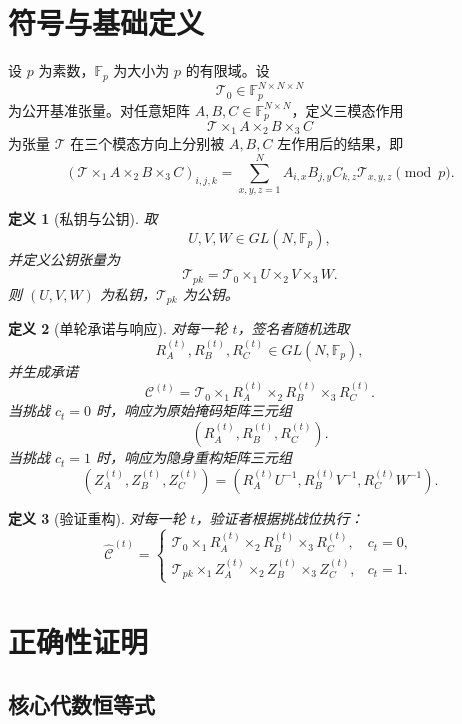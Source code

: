 \documentclass[12pt,a4paper]{article}
\newtheorem{definition}{定义}[section]
\theoremstyle{remark}
\begin{document}
\section{符号与基础定义}

设 $p$ 为素数，$\mathbb{F}_p$ 为大小为 $p$ 的有限域。设
\[
\mathcal{T}_0 \in \mathbb{F}_p^{N\times N\times N}
\]
为公开基准张量。对任意矩阵 $A,B,C\in \mathbb{F}_p^{N\times N}$，定义三模态作用
\[
\mathcal{T}\times_1 A \times_2 B \times_3 C
\]
为张量 $\mathcal{T}$ 在三个模态方向上分别被 $A,B,C$ 左作用后的结果，即
\[
(\mathcal{T}\times_1 A \times_2 B \times_3 C)_{i,j,k}
=\sum_{x,y,z=1}^{N}A_{i,x}B_{j,y}C_{k,z}\mathcal{T}_{x,y,z}\pmod p.
\]

\begin{definition}[私钥与公钥]
取
\[
U,V,W\in GL(N,\mathbb{F}_p),
\]
并定义公钥张量为
\[
\mathcal{T}_{pk}=\mathcal{T}_0 \times_1 U \times_2 V \times_3 W.
\]
则 $(U,V,W)$ 为私钥，$\mathcal{T}_{pk}$ 为公钥。
\end{definition}

\begin{definition}[单轮承诺与响应]
对每一轮 $t$，签名者随机选取
\[
R_A^{(t)},R_B^{(t)},R_C^{(t)}\in GL(N,\mathbb{F}_p),
\]
并生成承诺
\[
\mathcal{C}^{(t)}=\mathcal{T}_0\times_1 R_A^{(t)}\times_2 R_B^{(t)}\times_3 R_C^{(t)}.
\]
当挑战 $c_t=0$ 时，响应为原始掩码矩阵三元组
\[
(R_A^{(t)},R_B^{(t)},R_C^{(t)}).
\]
当挑战 $c_t=1$ 时，响应为隐身重构矩阵三元组
\[
(Z_A^{(t)},Z_B^{(t)},Z_C^{(t)})
=(R_A^{(t)}U^{-1},R_B^{(t)}V^{-1},R_C^{(t)}W^{-1}).
\]
\end{definition}

\begin{definition}[验证重构]
对每一轮 $t$，验证者根据挑战位执行：
\[
\widehat{\mathcal{C}}^{(t)}=
\begin{cases}
\mathcal{T}_0\times_1 R_A^{(t)}\times_2 R_B^{(t)}\times_3 R_C^{(t)}, & c_t=0,\\[0.4em]
\mathcal{T}_{pk}\times_1 Z_A^{(t)}\times_2 Z_B^{(t)}\times_3 Z_C^{(t)}, & c_t=1.
\end{cases}
\]
\end{definition}

\section{正确性证明}

\subsection{核心代数恒等式}
\end{document}
